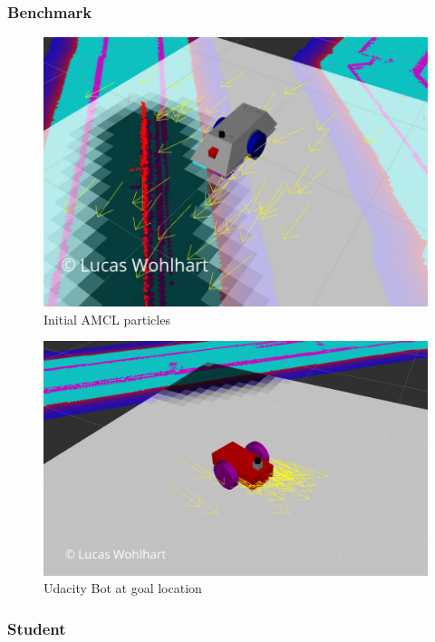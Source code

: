 \documentclass[10pt,journal,compsoc]{IEEEtran}
\begin{document}
\subsubsection{Benchmark}
\begin{figure}[thpb]
      \centering
      \includegraphics[width=\linewidth]{img/particles_initial}
      \caption{Initial AMCL particles}
      \label{fig:initial_amcl_particles}
\end{figure}
\begin{figure}[thpb]
      \centering
      \includegraphics[width=\linewidth]{img/udacity_bot_goal_location}
      \caption{Udacity Bot at goal location}
      \label{fig:udacity_bot_goal_location}
\end{figure}




\subsubsection{Student}
\end{document}
